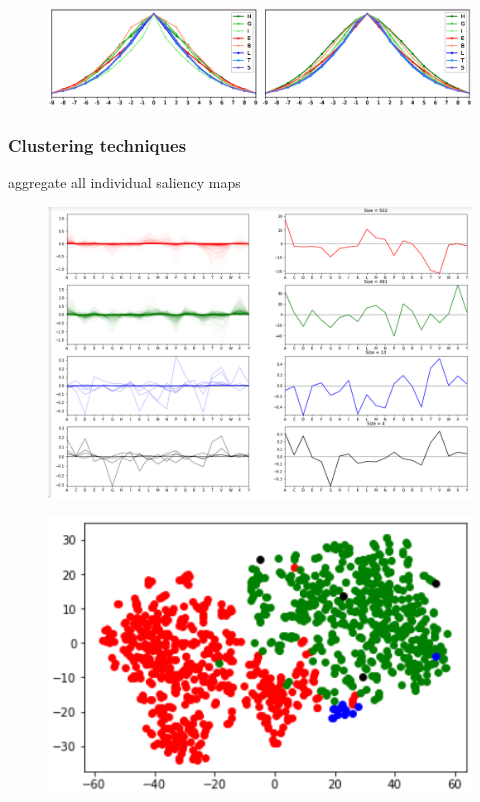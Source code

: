 		\begin{figure}
			\centering
			\includegraphics[width=1\linewidth]{Figures/sheer_class_aa}
			\caption{}
			\label{fig:sheer_class_aa}
		\end{figure}


	
		\subsubsection*{Clustering techniques}
		aggregate all individual saliency maps %
		
		\begin{figure}
		\centering
		\includegraphics[width=1\linewidth]{Figures/clusters}
		\caption{}
		\label{fig:clusters}
		\end{figure}
		
		\begin{figure}
		\centering
		\includegraphics[width=0.7\linewidth]{tsne}
		\caption{}
		\label{fig:tsne}
		\end{figure}

